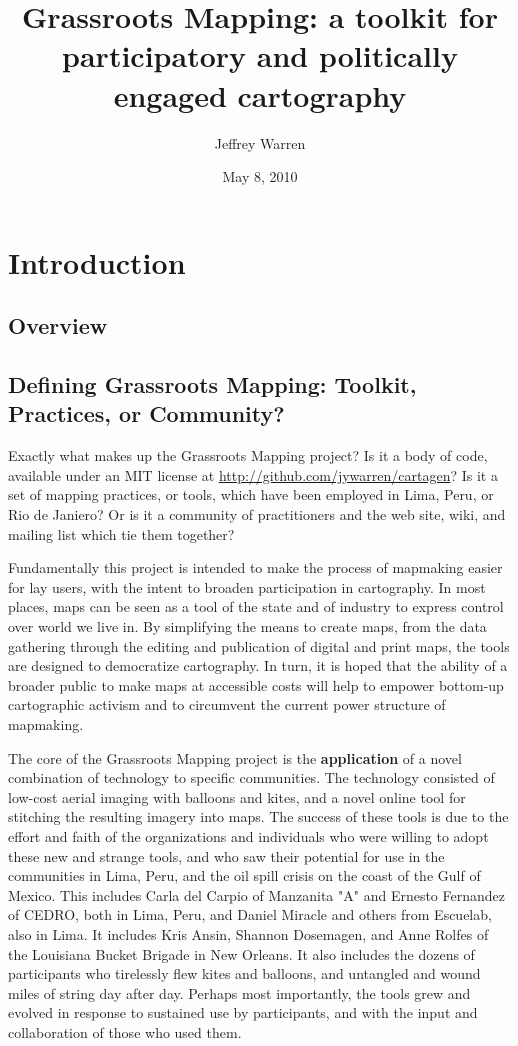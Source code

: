 \documentclass[11pt]{report}
\title{Grassroots Mapping: a toolkit for participatory and politically engaged cartography}
\author{Jeffrey Warren}
\date{May 8, 2010}
\begin{document}
\maketitle

\chapter{Introduction}
\section{Overview}
\section{Defining Grassroots Mapping: Toolkit, Practices, or Community?}

Exactly what makes up the Grassroots Mapping project? Is it a body of code, available under an MIT license at \url{http://github.com/jywarren/cartagen}? Is it a set of mapping practices, or tools, which have been employed in Lima, Peru, or Rio de Janiero? Or is it a community of practitioners and the web site, wiki, and mailing list which tie them together?

Fundamentally this project is intended to make the process of mapmaking easier for lay users, with the intent to broaden participation in cartography. In most places, maps can be seen as a tool of the state and of industry to express control over world we live in. By simplifying the means to create maps, from the data gathering through the editing and publication of digital and print maps, the tools are designed to democratize cartography. In turn, it is hoped that the ability of a broader public to make maps at accessible costs will help to empower bottom-up cartographic activism and to circumvent the current power structure of mapmaking. 

The core of the Grassroots Mapping project is the \textbf{application} of a novel combination of technology to specific communities. The technology consisted of low-cost aerial imaging with balloons and kites, and a novel online tool for stitching the resulting imagery into maps. The success of these tools is due to the effort and faith of the organizations and individuals who were willing to adopt these new and strange tools, and who saw their potential for use in the communities in Lima, Peru, and the oil spill crisis on the coast of the Gulf of Mexico. This includes Carla del Carpio of Manzanita "A" and Ernesto Fernandez of CEDRO, both in Lima, Peru, and Daniel Miracle and others from Escuelab, also in Lima. It includes Kris Ansin, Shannon Dosemagen, and Anne Rolfes of the Louisiana Bucket Brigade in New Orleans. It also includes the dozens of participants who tirelessly flew kites and balloons, and untangled and wound miles of string day after day. Perhaps most importantly, the tools grew and evolved in response to sustained use by participants, and with the input and collaboration of those who used them.
\end{document}
